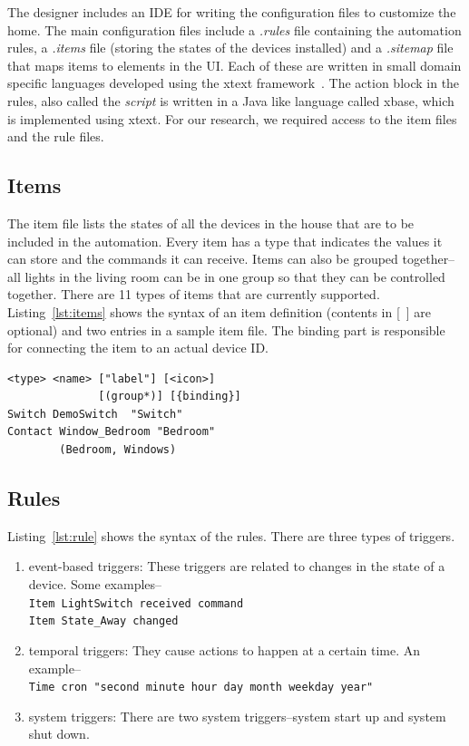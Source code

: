 \documentclass{sig-alternate-05-2015}
\begin{document}
The designer includes an IDE for writing the configuration files to customize the home. The main configuration files include a \textit{.rules} file containing the automation rules, a \textit{.items} file (storing the states of the devices installed) and a \textit{.sitemap} file that maps items to elements in the UI. Each of these are written in small domain specific languages developed using the xtext framework~\cite{xtext}. The action block in the rules, also called the \textit{script} is written in a Java like language called xbase, which is implemented using xtext. For our research, we required access to the item files and the rule files. 
\subsection{Items}
The item file lists the states of all the devices in the house that are to be included in the automation. Every item has a type that indicates the values it can store and the commands it can receive. Items can also be grouped together--all lights in the living room can be in one group so that they can be controlled together. There are 11 types of items that are currently supported. Listing~\ref{lst:items} shows the syntax of an item definition (contents in [~] are optional) and two entries in a sample item file. The binding part is responsible for connecting the item to an actual device ID.
\begin{lstlisting}[caption={Syntax and two examples of item definitions.},label={lst:items}]
<type> <name> ["label"] [<icon>] 
              [(group*)] [{binding}]
Switch DemoSwitch  "Switch"
Contact Window_Bedroom "Bedroom" 
        (Bedroom, Windows)
\end{lstlisting}
 
\subsection{Rules}
Listing~\ref{lst:rule} shows the syntax of the rules. There are three types of triggers.
\begin{enumerate} [topsep=0pt,itemsep=-1ex]
\item event-based triggers: These triggers are related to changes in the state of a device. Some examples--\\
\texttt{Item LightSwitch received command} \\
\texttt{Item State\_Away changed}
\item temporal triggers: They cause actions to happen at a certain time. An example--\\ \texttt{Time cron "second minute hour day month weekday year"}
\item system triggers: There are two system triggers--system start up and system shut down.
\end{enumerate}
\end{document}
